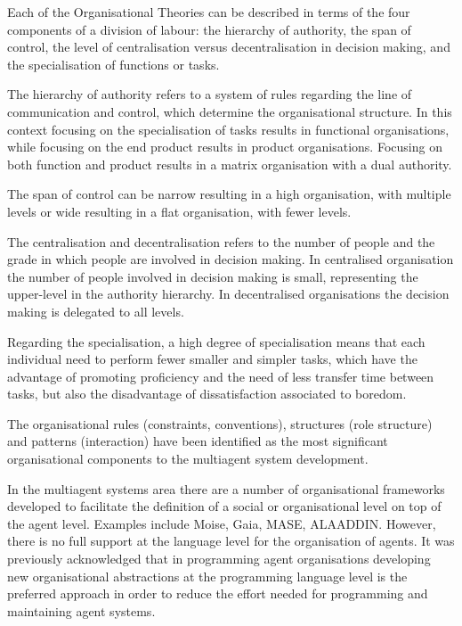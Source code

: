 \documentclass[a4paper,12pt,oneside,fleqn]{book} %
\begin{document}
Each of the Organisational Theories can be described in terms of the four
components of a division of labour: the hierarchy of authority, the span of
control, the level of centralisation versus decentralisation in decision
making, and the specialisation of functions or tasks.

The hierarchy of authority refers to a system of rules regarding the line
of communication and control, which determine the organisational structure.
In this context focusing on the specialisation of tasks results in
functional organisations, while focusing on the end product results in
product organisations. Focusing on both function and product results in a
matrix organisation with a dual authority.

The span of control can be narrow resulting in a high organisation, with
multiple levels or wide resulting in a flat organisation, with fewer levels.

The centralisation and decentralisation refers to the number of people and
the grade in which people are involved in decision making. In centralised
organisation the number of people involved in decision making is small,
representing the upper-level in the authority hierarchy. In decentralised
organisations the decision making is delegated to all levels.

Regarding the specialisation, a high degree of specialisation means that
each individual need to perform fewer smaller and simpler tasks, which have
the advantage of promoting proficiency and the need of less transfer time
between tasks, but also the disadvantage of dissatisfaction associated to
boredom.

The organisational rules (constraints, conventions), structures (role
structure) and patterns
(interaction) have been identified
as the most significant organisational components to the multiagent system
development\cite{DBLP:conf/aose/ZambonelliJW00}.

In the multiagent systems area there are a number of organisational
frameworks developed to facilitate the definition of a social or
organisational level on top of the agent level. Examples include Moise,
Gaia, MASE, ALAADDIN. However, there is no full support at the language
level for the organisation of agents. It was previously acknowledged that
in programming agent organisations developing new organisational
abstractions at the programming language level is the preferred approach in
order to reduce the effort needed for programming and maintaining agent
systems\cite{DBLP:conf/esaw/RiemsdijkHJ09}.
\end{document}
